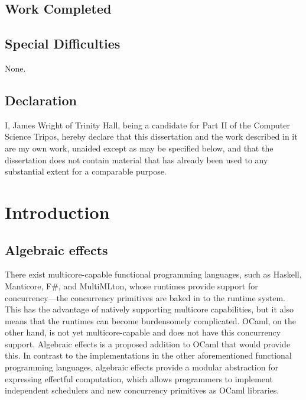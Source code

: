 \documentclass[12pt,a4paper,twoside,openright]{report}
\begin{document}
\section*{Work Completed}

\section*{Special Difficulties}

None.
 
\newpage
\section*{Declaration}

I, James Wright of Trinity Hall, being a candidate for Part II of the Computer
Science Tripos, hereby declare
that this dissertation and the work described in it are my own work,
unaided except as may be specified below, and that the dissertation
does not contain material that has already been used to any substantial
extent for a comparable purpose.

\bigskip
{}

\medskip
{}

\tableofcontents

\listoffigures


\pagestyle{headings}

\chapter{Introduction}

\section{Algebraic effects}

There exist multicore-capable functional programming languages, such as Haskell, Manticore, F\#, and MultiMLton, whose runtimes provide support for concurrency---the concurrency primitives are baked in to the runtime system. This has the advantage of natively supporting multicore capabilities, but it also means that the runtimes can become burdensomely complicated. OCaml, on the other hand, is not yet multicore-capable and does not have this concurrency support.
Algebraic effects is a proposed addition to OCaml that would provide this. In contrast to the implementations in the other aforementioned functional programming languages, algebraic effects provide a modular abstraction for expressing effectful computation, which allows programmers to implement independent schedulers and new concurrency primitives as OCaml libraries.
\end{document}
